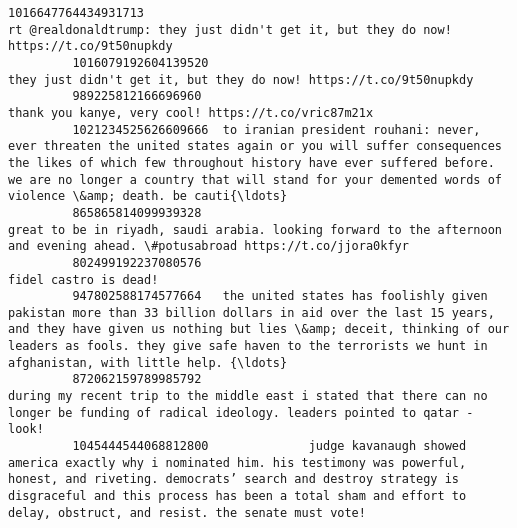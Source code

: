 \documentclass[11pt]{article}
\begin{document}
\begin{Verbatim}[commandchars=\\\{\}]
         1016647764434931713                                                                                                                                                                                                   rt @realdonaldtrump: they just didn't get it, but they do now! https://t.co/9t50nupkdy   
         1016079192604139520                                                                                                                                                                                                                        they just didn't get it, but they do now! https://t.co/9t50nupkdy   
         989225812166696960                                                                                                                                                                                                                                       thank you kanye, very cool! https://t.co/vric87m21x   
         1021234525626609666  to iranian president rouhani: never, ever threaten the united states again or you will suffer consequences the likes of which few throughout history have ever suffered before. we are no longer a country that will stand for your demented words of violence \&amp; death. be cauti{\ldots}   
         865865814099939328                                                                                                                                                             great to be in riyadh, saudi arabia. looking forward to the afternoon and evening ahead. \#potusabroad https://t.co/jjora0kfyr   
         802499192237080576                                                                                                                                                                                                                                                                     fidel castro is dead!   
         947802588174577664   the united states has foolishly given pakistan more than 33 billion dollars in aid over the last 15 years, and they have given us nothing but lies \&amp; deceit, thinking of our leaders as fools. they give safe haven to the terrorists we hunt in afghanistan, with little help. {\ldots}   
         872062159789985792                                                                                                                                               during my recent trip to the middle east i stated that there can no longer be funding of radical ideology. leaders pointed to qatar - look!   
         1045444544068812800              judge kavanaugh showed america exactly why i nominated him. his testimony was powerful, honest, and riveting. democrats’ search and destroy strategy is disgraceful and this process has been a total sham and effort to delay, obstruct, and resist. the senate must vote!   

\end{Verbatim}
\end{document}
